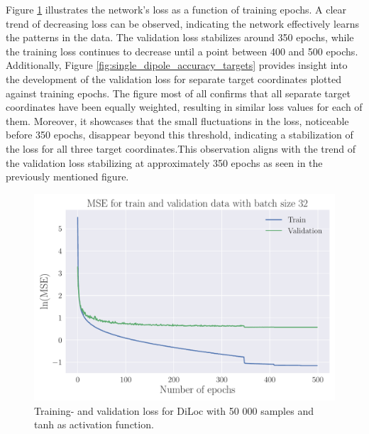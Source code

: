 \documentclass[a4paper, UKenglish, 11pt]{uiomaster}
\begin{document}
Figure \ref{fig:single_dipole_accuracy} illustrates the network's loss as a function of training epochs. A clear trend of decreasing loss can be observed, indicating the network effectively learns the patterns in the data. The validation loss stabilizes around 350 epochs, while the training loss continues to decrease until a point between 400 and 500 epochs. Additionally, Figure \ref{fig:single_dipole_accuracy_targets} provides insight into the development of the validation loss for separate target coordinates plotted against training epochs. The figure most of all confirms that all separate target coordinates have been equally weighted, resulting in similar loss values for each of them. Moreover, it showcases that the small fluctuations in the loss, noticeable before 350 epochs, disappear beyond this threshold, indicating a stabilization of the loss for all three target coordinates.This observation aligns with the trend of the validation loss stabilizing at approximately 350 epochs as seen in the previously mentioned figure.


\begin{figure}[!htb]
    \centering
    \includegraphics[width=\linewidth]{figures/mse_simple_32_0.001_0.35_0.5_0.0_500_(0).pdf}
    \caption{Training- and validation loss for DiLoc with 50 000 samples and tanh as activation function.}
    \label{fig:single_dipole_accuracy}
\end{figure}
\end{document}
